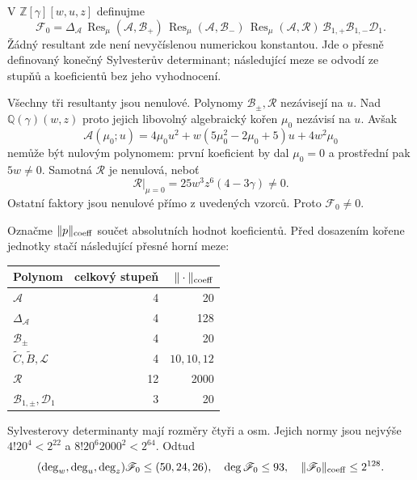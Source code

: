 \documentclass[11pt,a4paper]{article}
\theoremstyle{remark}\newtheorem{remark}[theorem]{Poznámka}
\numberwithin{equation}{section}
\begin{document}
V \(\mathbb Z[\gamma][w,u,z]\) definujme
\begin{equation}
\mathscr F_0=\Delta_{\mathscr A}\,
\operatorname{Res}_\mu(\mathscr A,\mathscr B_+)\,
\operatorname{Res}_\mu(\mathscr A,\mathscr B_-)\,
\operatorname{Res}_\mu(\mathscr A,\mathscr R)\,
\mathscr B_{1,+}\mathscr B_{1,-}\mathscr D_1.
\label{eq:Fbase}
\end{equation}
Žádný resultant zde není nevyčíslenou numerickou konstantou. Jde o přesně definovaný konečný Sylvesterův determinant; následující meze se odvodí ze stupňů a koeficientů bez jeho vyhodnocení.

Všechny tři resultanty jsou nenulové. Polynomy \(\mathscr B_\pm,\mathscr R\) nezávisejí na \(u\). Nad \(\mathbb Q(\gamma)(w,z)\) proto jejich libovolný algebraický kořen \(\mu_0\) nezávisí na \(u\). Avšak
\[
\mathscr A(\mu_0;u)=4\mu_0u^2+
w(5\mu_0^2-2\mu_0+5)u+4w^2\mu_0
\]
nemůže být nulovým polynomem: první koeficient by dal \(\mu_0=0\) a prostřední pak \(5w\ne0\). Samotná \(\mathscr R\) je nenulová, neboť
\[
\mathscr R|_{\mu=0}=25w^3z^6(4-3\gamma)\ne0.
\]
Ostatní faktory jsou nenulové přímo z uvedených vzorců. Proto \(\mathscr F_0\ne0\).

Označme \(\|p\|_{\rm coeff}\) součet absolutních hodnot koeficientů. Před dosazením kořene jednotky stačí následující přesné horní meze:
\begin{center}
\begin{tabular}{lrr}
\toprule
Polynom & celkový stupeň & \(\|\cdot\|_{\rm coeff}\)\\
\midrule
\(\mathscr A\) & 4 & 20\\
\(\Delta_{\mathscr A}\) & 4 & 128\\
\(\mathscr B_\pm\) & 4 & 20\\
\(\widetilde C,\widetilde B,\mathscr L\) & 4 & \(10,10,12\)\\
\(\mathscr R\) & 12 & 2000\\
\(\mathscr B_{1,\pm},\mathscr D_1\) & 3 & 20\\
\bottomrule
\end{tabular}
\end{center}
Sylvesterovy determinanty mají rozměry čtyři a osm. Jejich normy jsou nejvýše \(4!20^4<2^{22}\) a \(8!20^6 2000^2<2^{64}\). Odtud
\begin{equation}
(\deg_w,\deg_u,\deg_z)\mathscr F_0\le(50,24,26),\quad
\deg\mathscr F_0\le93,\quad
\|\mathscr F_0\|_{\rm coeff}\le2^{128}.
\label{eq:Fbase-bounds}
\end{equation}
\end{document}
